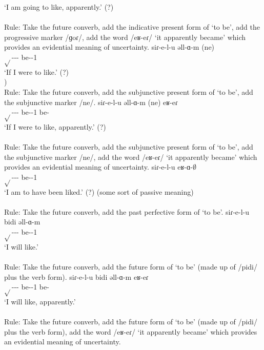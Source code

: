 \begin{exe}
\begin{xlist}
		\trans `I am going to like, apparently.' (?) \\
		 \\
		Rule: Take the future converb, add the indicative present form of `to be', add the progressive marker /ɡoɾ/, add the word /eʁ-eɾ/ `it apparently became' which provides an evidential meaning of uncertainty.
		\ex \gll siɾ-e-l-u əll-ɑ-m (ne) \\
		$\sqrt{}$-{\thgloss}-{\infgloss}-{\futcvb} be-{\thgloss}-1{\sg} {\sbjv} \\
		\trans `If I were to like.' (?) \\
		) \\
		Rule: Take the future converb, add the subjunctive present form of `to be', add the subjunctive marker /ne/.
		\ex \gll siɾ-e-l-u əll-ɑ-m (ne) eʁ-eɾ \\
		$\sqrt{}$-{\thgloss}-{\infgloss}-{\futcvb} be-{\thgloss}-1{\sg} {\sbjv} be-{\eptcp} \\
		\trans `If I were to like, apparently.' (?) \\
		 \\
		Rule: Take the future converb, add the subjunctive present form of `to be', add the subjunctive marker /ne/, add the word /eʁ-eɾ/ `it apparently became' which provides an evidential meaning of uncertainty.
		\ex \gll siɾ-e-l-u eʁ-ɑ-$\emptyset$ \\
		$\sqrt{}$-{\thgloss}-{\infgloss}-{\futcvb} be-{\pst}-1{\sg} \\
		\trans `I am to have been liked.' (?) (some sort of passive meaning) \\
		 \\
		Rule: Take the future converb, add the past perfective form of `to be'. 
		\ex \gll siɾ-e-l-u bidi əll-ɑ-m \\
		$\sqrt{}$-{\thgloss}-{\infgloss}-{\futcvb} {\futcvb} be-{\thgloss}-1{\sg} \\
		\trans `I will like.' \\
		 \\
		Rule: Take the future converb, add the future form of `to be' (made up of /pidi/ plus the verb form). 
		\ex \gll siɾ-e-l-u bidi əll-ɑ-m eʁ-eɾ \\
		$\sqrt{}$-{\thgloss}-{\infgloss}-{\futcvb} {\futcvb} be-{\thgloss}-1{\sg} be-{\eptcp} \\
		\trans `I will like, apparently.' \\
		 \\
		Rule: Take the future converb, add the future form of `to be' (made up of /pidi/ plus the verb form), add the word /eʁ-eɾ/ `it apparently became' which provides an evidential meaning of uncertainty. 
	\end{xlist}
\end{exe}

